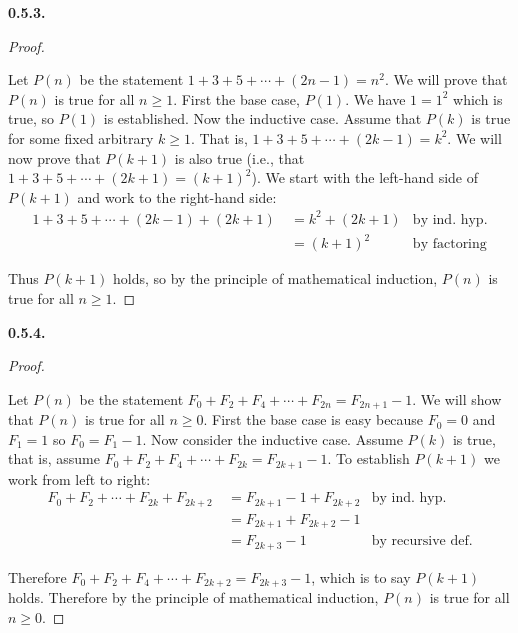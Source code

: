 \documentclass[12pt,]{book}
\theoremstyle{plain}
\theoremstyle{definition}
\theoremstyle{definition}
\theoremstyle{definition}
\numberwithin{equation}{chapter}
\newcommand{\amp}{&}
\begin{document}
\par\smallskip
\noindent\textbf{0.5.3.} \begin{proof}\hypertarget{proof-7}{}
\hypertarget{p-435}{}%
Let \(P(n)\) be the statement \(1+3 +5 + \cdots + (2n-1) = n^2\). We will prove that \(P(n)\) is true for all \(n \ge 1\). First the base case, \(P(1)\). We have \(1 = 1^2\) which is true, so \(P(1)\) is established. Now the inductive case. Assume that \(P(k)\) is true for some fixed arbitrary \(k \ge 1\). That is, \(1 + 3 + 5 + \cdots + (2k-1) = k^2\). We will now prove that \(P(k+1)\) is also true (i.e., that \(1 + 3 + 5 + \cdots + (2k+1) = (k+1)^2\)). We start with the left-hand side of \(P(k+1)\) and work to the right-hand side:%
\begin{align*}
1 + 3 + 5 + \cdots + (2k-1) + (2k+1) ~ \amp = k^2 + (2k+1) \amp \text{by ind. hyp.}\\
\amp = (k+1)^2 \amp \text{by factoring}
\end{align*}
%
\par
\hypertarget{p-436}{}%
Thus \(P(k+1)\) holds, so by the principle of mathematical induction, \(P(n)\) is true for all \(n \ge 1\).%
\end{proof}
\par\smallskip
\noindent\textbf{0.5.4.} \begin{proof}\hypertarget{proof-8}{}
\hypertarget{p-438}{}%
Let \(P(n)\) be the statement \(F_0 + F_2 + F_4 + \cdots + F_{2n} = F_{2n+1} - 1\). We will show that \(P(n)\) is true for all \(n \ge 0\). First the base case is easy because \(F_0 = 0\) and \(F_1 = 1\) so \(F_0 = F_1 - 1\). Now consider the inductive case. Assume \(P(k)\) is true, that is, assume \(F_0 + F_2 + F_4 + \cdots + F_{2k} = F_{2k+1} - 1\). To establish \(P(k+1)\) we work from left to right:%
\begin{align*}
F_0 + F_2 + \cdots + F_{2k} + F_{2k+2} ~ \amp = F_{2k+1} - 1 + F_{2k+2} \amp \text{by ind. hyp.}\\
\amp = F_{2k+1} + F_{2k+2} - 1 \amp\\
\amp = F_{2k+3} - 1 \amp \text{by recursive def.}
\end{align*}
%
\par
\hypertarget{p-439}{}%
Therefore \(F_0 + F_2 + F_4 + \cdots + F_{2k+2} = F_{2k+3} - 1\), which is to say \(P(k+1)\) holds. Therefore by the principle of mathematical induction, \(P(n)\) is true for all \(n \ge 0\).%
\end{proof}
\par\smallskip
\end{document}
